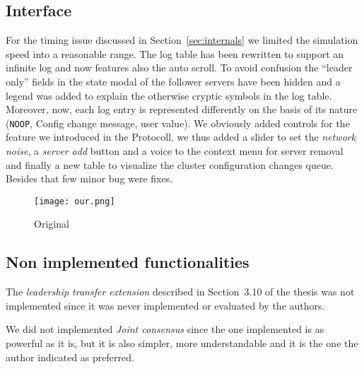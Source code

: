 \subsection{Interface}
For the timing issue discussed in Section~\ref{sec:internals} we limited the
simulation speed into a reasonable range.
The log table has been rewritten to support an infinite log and
now features also the auto scroll.
To avoid confusion the ``leader only'' fields in the state modal of the
follower servers have been hidden and a legend was added to explain the
otherwise cryptic symbols in the log table. Moreover, now, each log entry
is represented differently on the basis of its nature (\texttt{NOOP}, Config
change message, user value).
We obviously added controls for the feature we introduced in the Protocoll,
we thus added a slider to set the \emph{network noise}, a \emph{server add}
button and a voice to the context menu for server removal and finally
a new table to visualize the cluster configuration changes queue.
Besides that few minor bug were fixes.

\begin{figure}[h]
    \centering
    \texttt{[image: our.png]}
    \caption{Original}\label{fig:final}
\end{figure}

\subsection{Non implemented functionalities}
The \emph{leadership transfer extension} described in Section~3.10 of the thesis
was not implemented since it was never implemented or evaluated by the authors.

We did not implemented \emph{Joint consensus} since the one implemented is as
powerful as it is, but it is also simpler, more understandable and it is
the one the author indicated as preferred.
